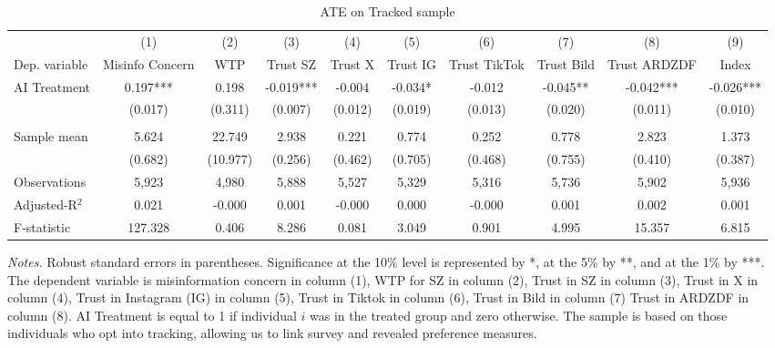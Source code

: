  \begin{table}[H]
 \centering 
 \caption{ATE on Tracked sample} 
 \label{tab:resultssurvey_ate_tracked} 
 \begin{adjustbox}{max width=\textwidth} 
\begin{tabular}{lccccccccc} 
 \toprule
& (1) & (2) & (3) & (4) & (5) & (6) & (7) & (8) & (9)  \\
 Dep. variable & Misinfo Concern & WTP & Trust SZ & Trust X & Trust IG & Trust TikTok & Trust Bild & Trust ARDZDF & Index\\ 
 \midrule 
AI Treatment    &    0.197***&    0.198   &   -0.019***&   -0.004   &   -0.034*  &   -0.012   &   -0.045** &   -0.042***&   -0.026***\\
                &  (0.017)   &  (0.311)   &  (0.007)   &  (0.012)   &  (0.019)   &  (0.013)   &  (0.020)   &  (0.011)   &  (0.010)   \\
& & & & & & & & &  \\
Sample mean&      5.624 &     22.749 &      2.938 &      0.221 &      0.774 &      0.252 &      0.778 &      2.823 &      1.373  \\
& (0.682) & (10.977) & (0.256) & (0.462) & (0.705) & (0.468) & (0.755) & (0.410) & (0.387)  \\
 \midrule
Observations &      5,923 &      4,980 &      5,888 &      5,527 &      5,329 &      5,316 &      5,736 &      5,902 &      5,936  \\
Adjusted-R$^2$ &      0.021 &     -0.000 &      0.001 &     -0.000 &      0.000 &     -0.000 &      0.001 &      0.002 &      0.001  \\
F-statistic &    127.328 &      0.406 &      8.286 &      0.081 &      3.049 &      0.901 &      4.995 &     15.357 &      6.815  \\
 \bottomrule
 \end{tabular}
 \end{adjustbox}
 \par
 \begin{minipage}{1\linewidth}
 \baselineskip9pt {\scriptsize \vspace{0.1cm} { \it Notes.} Robust standard errors in parentheses. Significance at the 10\% level is represented by *, at the 5\% by **, and at the 1\% by ***. The dependent variable is misinformation concern in column (1), WTP for SZ in column (2), Trust in SZ in column (3), Trust in X in column (4), Trust in Instagram (IG) in column (5), Trust in Tiktok in column (6), Trust in Bild in column (7) Trust in ARDZDF in column (8). AI Treatment is equal to 1 if individual $i$ was in the treated group and zero otherwise. The sample is based on those individuals who opt into tracking, allowing us to link survey and revealed preference measures.}
 \end{minipage}
 \end{table}
